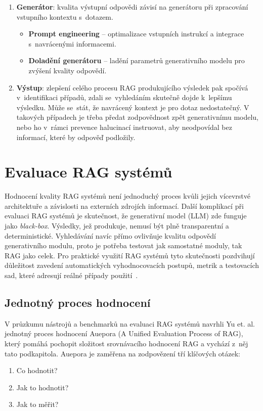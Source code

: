 \begin{enumerate}
    \item \textbf{Generátor}: kvalita výstupní odpovědi závisí na generátoru při zpracování vstupního kontextu s~dotazem.
    \begin{itemize}
        \item \textbf{Prompt engineering} – optimalizace vstupních instrukcí a integrace s~navrácenými informacemi.
        \item \textbf{Doladění generátoru} – ladění parametrů generativního modelu pro zvýšení kvality odpovědí.
    \end{itemize}

    \item \textbf{Výstup}: zlepšení celého procesu RAG produkujícího výsledek pak spočívá v~identifikaci případů, zdali se~vyhledáním skutečně dojde k~lepšímu výsledku. Může se~stát, že navrácený kontext je pro dotaz nedostatečný. V takových případech je třeba předat zodpovědnost zpět generativnímu modelu, nebo ho v~rámci prevence halucinací instruovat, aby neodpovídal bez informací, které by odpověď podložily.
\end{enumerate}

\section{Evaluace RAG systémů}
\label{evaluaceteorie}

Hodnocení kvality RAG systémů není jednoduchý proces kvůli jejich vícevrstvé architektuře a závislosti na externích zdrojích informací. Další komplikací při evaluaci RAG systémů je skutečnost, že generativní model (LLM) zde funguje jako \textit{black-box}. Výsledky, jež produkuje, nemusí být plně transparentní a deterministické. Vyhledávání navíc přímo ovlivňuje kvalitu odpovědí generativního modulu, proto je potřeba testovat jak samostatné moduly, tak RAG jako celek. Pro praktické využití RAG systémů tyto skutečnosti pozdvihují důležitost zavedení automatických vyhodnocovacích postupů, metrik a testovacích sad, které adresují reálné případy použití~\cite{yu2025evaluationrag}.

\subsection{Jednotný proces hodnocení}
V průzkumu nástrojů a benchmarků na evaluaci RAG systémů navrhli Yu et. al.~\cite{yu2025evaluationrag} jednotný proces hodnocení Auepora (A Unified Evaluation Process of RAG), který pomáhá pochopit složitost srovnávacího hodnocení RAG a vychází z~něj tato podkapitola. Auepora je zaměřena na zodpovězení tří klíčových otázek:
\begin{enumerate}
    \item Co hodnotit?
    \item Jak to hodnotit?
    \item Jak to měřit?
\end{enumerate}

